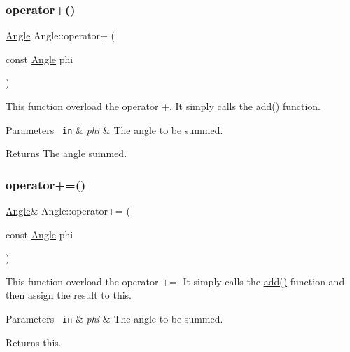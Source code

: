 \subsubsection{\texorpdfstring{operator+()}{operator+()}}
{\footnotesize\ttfamily \mbox{\hyperlink{class_angle}{Angle}} Angle\+::operator+ (\begin{DoxyParamCaption}\item[{const \mbox{\hyperlink{class_angle}{Angle}}}]{phi }\end{DoxyParamCaption})\hspace{0.3cm}{\ttfamily [inline]}}

This function overload the operator +. It simply calls the {\ttfamily \mbox{\hyperlink{class_angle_ab7279e3fb4ab12c334153f992ede0f1c}{add()}}} function. 
\begin{DoxyParams}[1]{Parameters}
\mbox{\texttt{ in}}  & {\em phi} & The angle to be summed. \\
\hline
\end{DoxyParams}
\begin{DoxyReturn}{Returns}
The angle summed. 
\end{DoxyReturn}
\mbox{\label{class_angle_a8129646ed5390b538ccf7c19f9213967}} 
\subsubsection{\texorpdfstring{operator+=()}{operator+=()}}
{\footnotesize\ttfamily \mbox{\hyperlink{class_angle}{Angle}}\& Angle\+::operator+= (\begin{DoxyParamCaption}\item[{const \mbox{\hyperlink{class_angle}{Angle}}}]{phi }\end{DoxyParamCaption})\hspace{0.3cm}{\ttfamily [inline]}}

This function overload the operator +=. It simply calls the {\ttfamily \mbox{\hyperlink{class_angle_ab7279e3fb4ab12c334153f992ede0f1c}{add()}}} function and then assign the result to this. 
\begin{DoxyParams}[1]{Parameters}
\mbox{\texttt{ in}}  & {\em phi} & The angle to be summed. \\
\hline
\end{DoxyParams}
\begin{DoxyReturn}{Returns}
{\ttfamily this}. 
\end{DoxyReturn}
\mbox{\label{class_angle_a951436019a4c06895ba31a08bf0d6fd2}} 
